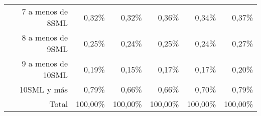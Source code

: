 \begin{tabular}{llllll}
\multicolumn{1}{r}{7 a menos de 8SML\hspace{1em}} &
  \multicolumn{1}{|r}{0,32\%} &
  \multicolumn{1}{r}{0,32\%} &
  \multicolumn{1}{r}{0,36\%} &
  \multicolumn{1}{r}{0,34\%} &
  \multicolumn{1}{r}{0,37\%} \\
\multicolumn{1}{r}{8 a menos de 9SML\hspace{1em}} &
  \multicolumn{1}{|r}{0,25\%} &
  \multicolumn{1}{r}{0,24\%} &
  \multicolumn{1}{r}{0,25\%} &
  \multicolumn{1}{r}{0,24\%} &
  \multicolumn{1}{r}{0,27\%} \\
\multicolumn{1}{r}{9 a menos de 10SML\hspace{1em}} &
  \multicolumn{1}{|r}{0,19\%} &
  \multicolumn{1}{r}{0,15\%} &
  \multicolumn{1}{r}{0,17\%} &
  \multicolumn{1}{r}{0,17\%} &
  \multicolumn{1}{r}{0,20\%} \\
\multicolumn{1}{r}{10SML y más\hspace{1em}} &
  \multicolumn{1}{|r}{0,79\%} &
  \multicolumn{1}{r}{0,66\%} &
  \multicolumn{1}{r}{0,66\%} &
  \multicolumn{1}{r}{0,70\%} &
  \multicolumn{1}{r}{0,79\%} \\
\multicolumn{1}{r}{Total\hspace{1em}} &
  \multicolumn{1}{|r}{100,00\%} &
  \multicolumn{1}{r}{100,00\%} &
  \multicolumn{1}{r}{100,00\%} &
  \multicolumn{1}{r}{100,00\%} &
  \multicolumn{1}{r}{100,00\%} \\
\cline{1-6}
\end{tabular}
